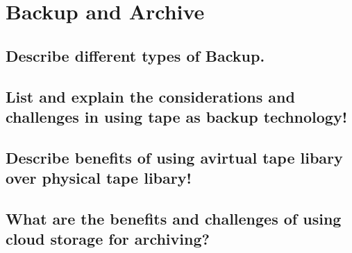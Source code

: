 \section{Backup and Archive} %
\label{sec:backup_and_archive}

\subsection{Describe different types of Backup.} %
\label{sub:describe_different_types_of_backup}


\subsection{List and explain the considerations and challenges in using tape as backup technology!} %
\label{sub:list_and_explain_the_considerations_and_challenges_in_using_tape_as_backup_technology}


\subsection{Describe benefits of using avirtual tape libary over physical tape libary!} %
\label{sub:describe_benefits_of_using_avirtual_tape_libary_over_physical_tape_libary}


\subsection{What are the benefits and challenges of using cloud storage for archiving?} %
\label{sub:what_are_the_benefits_and_challenges_of_using_cloud_storage_for_archiving}


